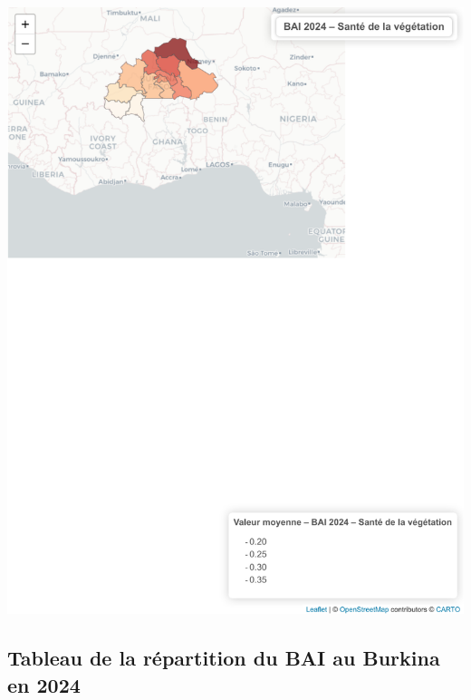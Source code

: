 \documentclass[
]{book}
\begin{document}
\includegraphics{Atlas-Spectral-Sahel_files/figure-latex/vegetation-bai-1.pdf}

\subsection{Tableau de la répartition du BAI au Burkina en 2024}\label{tableau-de-la-ruxe9partition-du-bai-au-burkina-en-2024}
\end{document}
